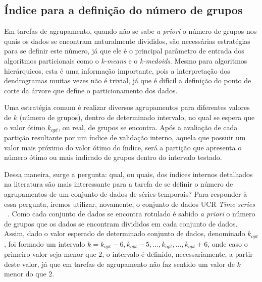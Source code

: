 \subsection{Índice para a definição do número de grupos} \label{sec:indice_iterativo}

Em tarefas de agrupamento, quando não se sabe \emph{a priori} o número de grupos nos quais os dados se encontram naturalmente divididos, são necessárias estratégias para se definir este número, já que ele é o principal parâmetro de entrada dos algoritmos particionais como o \emph{k-means} e o \emph{k-medoids}. Mesmo para algoritmos hierárquicos, esta é uma informação importante, pois a interpretação dos dendrogramas muitas vezes não é trivial, já que é difícil a definição do ponto de corte da árvore que define o particionamento dos dados. 

Uma estratégia comum é realizar diversos agrupamentos para diferentes valores de $k$ (número de grupos), dentro de determinado intervalo, no qual se espera que o valor ótimo $k_{opt}$, ou real, de grupos se encontra. Após a avaliação de cada partição resultante por um índice de validação interno, aquela que possuir um valor mais próximo do valor ótimo do índice, será a partição que apresenta o número ótimo ou mais indicado de grupos dentro do intervalo testado.

Dessa maneira, surge a pergunta: qual, ou quais, dos índices internos detalhados na literatura são mais interessante para a tarefa de se definir o número de agrupamentos de um conjunto de dados de séries temporais? Para responder à essa pergunta, iremos utilizar, novamente, o conjunto de dados UCR \emph{Time series} ~\parencite{UCRArchive}. Como cada conjunto de dados se encontra rotulado é sabido \emph{a priori} o número de grupos que os dados se encontram divididos em cada conjunto de dados. Assim, dado o valor esperado de determinado conjunto de dados, denominado $k_{opt}$, foi formado um intervalo $k = k_{opt}-6,k_{opt}-5,...,k_{opt},...,k_{opt}+6$, onde caso o primeiro valor seja menor que $2$, o intervalo é definido, necessariamente, a partir deste valor, já que em tarefas de agrupamento não faz sentido um valor de $k$ menor do que $2$.

